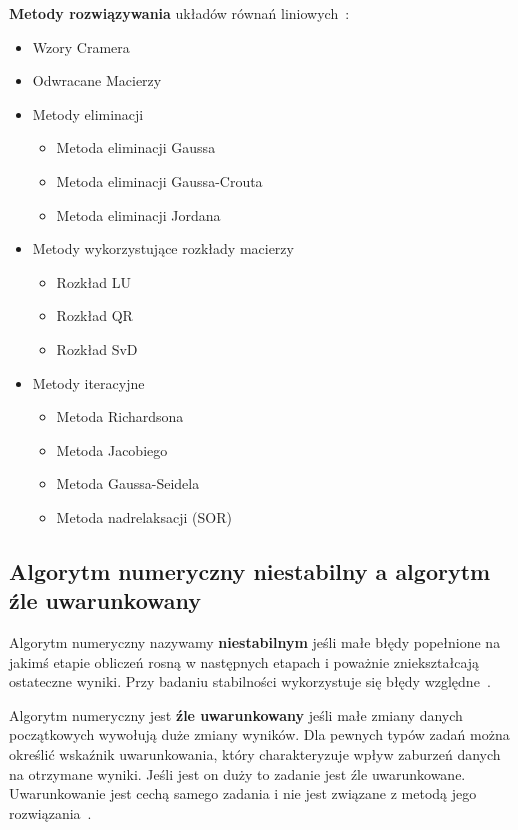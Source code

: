 \documentclass[wi]{zut}
\begin{document}
\textbf{Metody rozwiązywania} układów równań liniowych~\cite{Piela_URL}:

\begin{itemize}
    \item Wzory Cramera
    \item Odwracane Macierzy
    \item Metody eliminacji
    \begin{itemize}
        \item Metoda eliminacji Gaussa
        \item Metoda eliminacji Gaussa-Crouta
        \item Metoda eliminacji Jordana
    \end{itemize}
    \item Metody wykorzystujące rozkłady macierzy
    \begin{itemize}
        \item Rozkład LU
        \item Rozkład QR
        \item Rozkład SvD
    \end{itemize}
    \item Metody iteracyjne
    \begin{itemize}
        \item Metoda Richardsona
        \item Metoda Jacobiego
        \item Metoda Gaussa-Seidela
        \item Metoda nadrelaksacji (SOR)
    \end{itemize}
\end{itemize}

\subsection{Algorytm numeryczny niestabilny a algorytm źle uwarunkowany}

Algorytm numeryczny nazywamy \textbf{niestabilnym} jeśli małe błędy popełnione na jakimś etapie obliczeń rosną w następnych etapach i poważnie zniekształcają ostateczne wyniki. Przy badaniu stabilności wykorzystuje się błędy względne~\cite{Piela_Wstep}.

Algorytm numeryczny jest \textbf{źle uwarunkowany} jeśli małe zmiany danych początkowych wywołują duże zmiany wyników. Dla pewnych typów zadań można określić wskaźnik uwarunkowania, który charakteryzuje wpływ zaburzeń danych na otrzymane wyniki. Jeśli jest on duży to zadanie jest źle uwarunkowane. Uwarunkowanie jest cechą samego zadania i nie jest związane z metodą jego rozwiązania~\cite{Piela_Wstep}.
\end{document}
